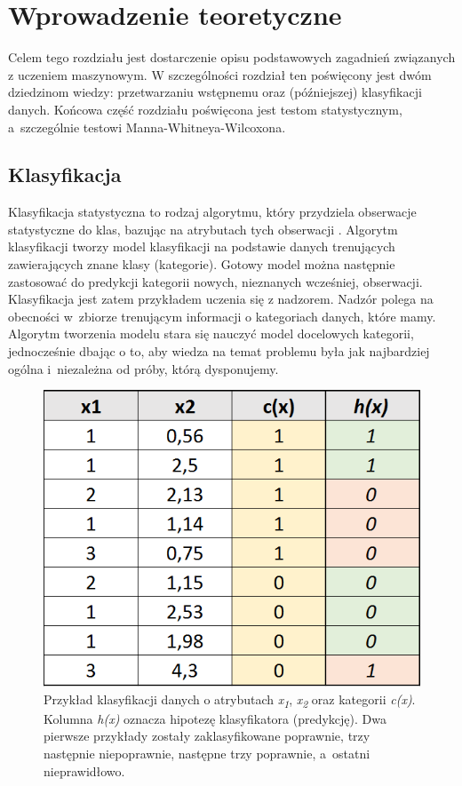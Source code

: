 \documentclass[../thesis.tex]{subfiles}
\begin{document}
\pagestyle{plain}
\chapter{Wprowadzenie teoretyczne}

Celem tego rozdziału jest dostarczenie opisu podstawowych zagadnień związanych z uczeniem maszynowym. W szczególności rozdział ten poświęcony jest dwóm dziedzinom wiedzy: przetwarzaniu wstępnemu oraz (późniejszej) klasyfikacji danych. Końcowa część rozdziału poświęcona jest testom statystycznym, a~szczególnie testowi Manna-Whitneya-Wilcoxona.

\section{Klasyfikacja}

Klasyfikacja statystyczna to rodzaj algorytmu, który przydziela obserwacje statystyczne do klas, bazując na atrybutach tych obserwacji \cite{def_classification}. Algorytm klasyfikacji tworzy model klasyfikacji na podstawie danych trenujących zawierających znane klasy (kategorie). Gotowy model można następnie zastosować  do predykcji kategorii nowych, nieznanych wcześniej, obserwacji. Klasyfikacja jest zatem przykładem uczenia się z nadzorem. Nadzór polega na obecności w~zbiorze trenującym informacji o kategoriach danych, które mamy. Algorytm tworzenia modelu stara się nauczyć model docelowych kategorii, jednocześnie dbając o to, aby wiedza na temat problemu była jak najbardziej ogólna i~niezależna od próby, którą dysponujemy.

\begin{figure}[h]
\centering
\includegraphics[height=.2\textheight]{classification.png}
\caption{Przykład klasyfikacji danych o atrybutach \emph{x\textsubscript{1}}, \emph{x\textsubscript{2}} oraz kategorii \emph{c(x)}. Kolumna \emph{h(x)} oznacza hipotezę klasyfikatora (predykcję). Dwa pierwsze przykłady zostały zaklasyfikowane poprawnie, trzy następnie niepoprawnie, następne trzy poprawnie, a~ostatni nieprawidłowo. }
\label{classification:basic}
\end{figure}
\end{document}
